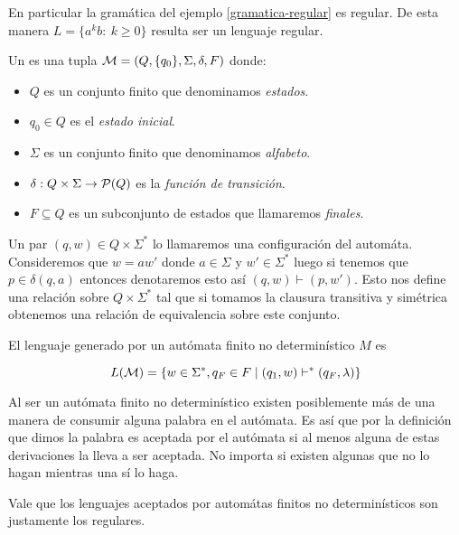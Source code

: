 \documentclass[tesis.tex]{subfiles}
\begin{document}
En particular la gramática del ejemplo \ref{gramatica-regular} es regular. 
De esta manera $L= \{ a^k b : \ k \ge 0  \}$ resulta ser un lenguaje regular.


\begin{deff}
	Un  es una tupla ${\cal M} = (Q,\{q_0\},\Sigma,\delta,F)$ donde:
	\begin{itemize}
	\item $Q$ es un conjunto finito que denominamos \emph{estados}.
	\item $q_0 \in Q$ es el \emph{estado inicial}.
	\item $\Sigma$ es un conjunto finito que denominamos \emph{alfabeto}.
	\item $\delta:Q \times \Sigma \to {\cal P}(Q)$ es la \emph{función de transición}.
	\item $F \subseteq Q$ es un subconjunto de estados que llamaremos \emph{finales}.
	\end{itemize}
\end{deff}

Un par $(q,w) \in Q \times \Sigma^*$ lo llamaremos una configuración del automáta.
Consideremos que $w = aw'$ donde $a \in \Sigma$ y $w' \in \Sigma^*$ luego si tenemos que $p \in \delta(q,a) $ entonces denotaremos esto así $(q,w) \vdash (p,w')$.
Esto nos define una relación sobre $Q \times \Sigma^*$ tal que si tomamos la clausura transitiva y simétrica obtenemos una relación de equivalencia sobre este conjunto.


\begin{deff}
	El lenguaje generado por un autómata finito no determinístico $M$ es
	
	\[
		L({\cal M} ) = \{  w \in \Sigma^*, q_F \in F \mid (q_1,w) \vdash^* (q_F,\lambda)     \}
	\]
	
	
\end{deff}

\begin{obs}
	Al ser un autómata finito no determinístico existen posiblemente más de una manera de consumir alguna palabra en el autómata. 
	Es así que por la definición que dimos la palabra es aceptada por el autómata si al menos alguna de estas derivaciones la lleva a ser aceptada.
	No importa si existen algunas que no lo hagan mientras una sí lo haga. 
\end{obs}

Vale que los lenguajes aceptados por automátas finitos no determinísticos son justamente los regulares.
\end{document}
